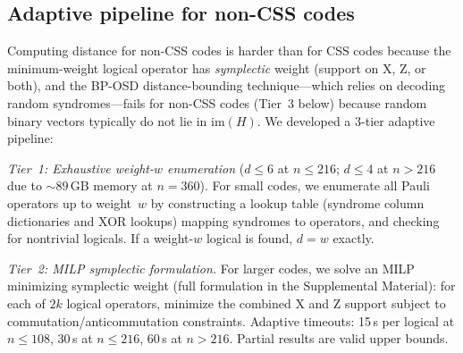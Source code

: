 \documentclass[aps,prxquantum,twocolumn,superscriptaddress,nofootinbib]{revtex4-2}
\begin{document}
\subsection{Adaptive pipeline for non-CSS codes}
\label{sec:noncss_pipeline}

Computing distance for non-CSS codes is harder than for CSS codes because the minimum-weight logical operator has \emph{symplectic} weight (support on X, Z, or both), and the BP-OSD distance-bounding technique---which relies on decoding random syndromes---fails for non-CSS codes (Tier~3 below) because random binary vectors typically do not lie in $\mathrm{im}(H)$.
We developed a 3-tier adaptive pipeline:

\emph{Tier~1: Exhaustive weight-$w$ enumeration} ($d \leq 6$ at $n \leq 216$; $d \leq 4$ at $n > 216$ due to ${\sim}89$\,GB memory at $n = 360$).
For small codes, we enumerate all Pauli operators up to weight~$w$ by constructing a lookup table (syndrome column dictionaries and XOR lookups) mapping syndromes to operators, and checking for nontrivial logicals.
If a weight-$w$ logical is found, $d = w$ exactly.

\emph{Tier~2: MILP symplectic formulation.}
For larger codes, we solve an MILP minimizing symplectic weight (full formulation in the Supplemental Material): for each of $2k$ logical operators, minimize the combined X and Z support subject to commutation/anticommutation constraints.
Adaptive timeouts: 15\,s per logical at $n \leq 108$, 30\,s at $n \leq 216$, 60\,s at $n > 216$.
Partial results are valid upper bounds.
\end{document}
